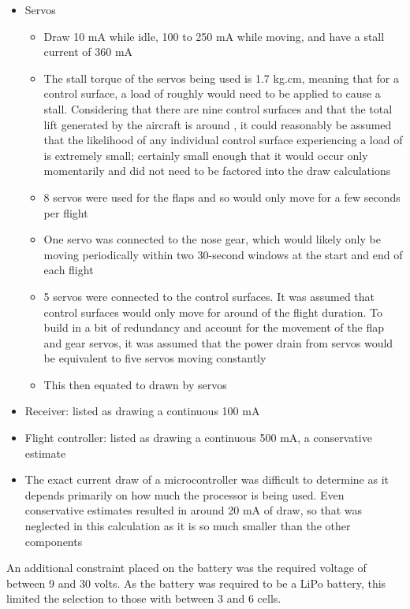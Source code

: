 \documentclass[../../main.tex]{subfiles}
\begin{document}
\begin{itemize}
    \item Servos
        \begin{itemize}
            \item Draw 10 mA while idle, 100 to 250 mA while moving, and have a stall current of 360 mA 
            \item The stall torque of the servos being used is 1.7 kg.cm, meaning that for a  control surface, a load of roughly  would need to be applied to cause a stall.
                Considering that there are nine control surfaces and that the total lift generated by the aircraft is around , it could reasonably be assumed that the likelihood of any individual control surface experiencing a load of  is extremely small; certainly small enough that it would occur only momentarily and did not need to be factored into the draw calculations 
            \item 8 servos were used for the flaps and so would only move for a few seconds per flight 
            \item One servo was connected to the nose gear, which would likely only be moving periodically within two 30-second windows at the start and end of each flight 
            \item 5 servos were connected to the control surfaces.
                It was assumed that control surfaces would only move for around  of the flight duration.
                To build in a bit of redundancy and account for the movement of the flap and gear servos, it was assumed that the power drain from servos would be equivalent to five servos moving constantly 
            \item This then equated to  drawn by servos 
        \end{itemize}
    \item Receiver: listed as drawing a continuous 100 mA 
    \item Flight controller: listed as drawing a continuous 500 mA, a conservative estimate 
    \item The exact current draw of a microcontroller was difficult to determine as it depends primarily on how much the processor is being used.
        Even conservative estimates resulted in around 20 mA of draw, so that was neglected in this calculation as it is so much smaller than the other components 
\end{itemize}

An additional constraint placed on the battery was the required voltage of between 9 and 30 volts.
As the battery was required to be a LiPo battery, this limited the selection to those with between 3 and 6 cells. 
\end{document}
